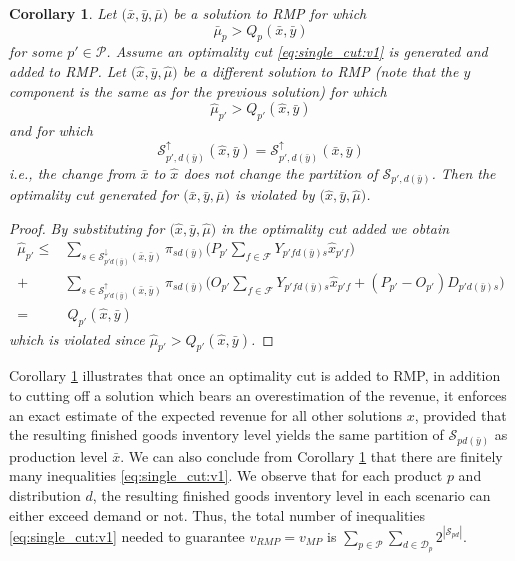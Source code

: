 \documentclass[12pt]{article}
\newtheorem{corollary}[theorem]{Corollary}%
\theoremstyle{thmstylethree}%
\newcommand{\mtc}[1] {\mathcal{#1}}
\begin{document}
\begin{corollary}\label{cor:oc:otherx}
Let $\big(\bar{x},\bar{y},\bar{\mu}\big)$ be a solution to RMP for which 
$$\bar{\mu}_p > Q_{p}(\bar{x},\bar{y})$$
for some $p'\in\mtc{P}$. Assume an optimality cut \eqref{eq:single_cut:v1} is generated and added to RMP.
Let $\big(\hat{x},\bar{y},\hat{\mu}\big)$ be a different solution to RMP (note that the $y$ component is the same as for the previous solution) for which 
$$\hat{\mu}_{p'} > Q_{p'}(\hat{x},\bar{y})$$
and for which 
$$\mathcal{S}^{\uparrow}_{p',d(\bar{y})}(\hat{x},\bar{y}) =\mathcal{S}^{\uparrow}_{p',d(\bar{y})}(\bar{x},\bar{y}) $$
i.e., the change from $\bar{x}$ to $\hat{x}$ does not change the partition of $\mathcal{S}_{p',d(\bar{y})}$.
Then the optimality cut generated for 
$\big(\bar{x},\bar{y},\bar{\mu}\big)$
is violated by $\big(\hat{x},\bar{y},\hat{\mu}\big)$.
\end{corollary}
\begin{proof}
\itshape
  By substituting for $\big(\hat{x},\bar{y},\hat{\mu}\big)$ in the optimality cut added we obtain 
\begin{align*}
\hat{\mu}_{p'} \leq & \sum_{s \in \mathcal{S}^{\downarrow}_{p'd(\bar{y})}(\bar{x},\bar{y})} \pi_{sd(\bar{y})} \bigg(P_{p'} \sum_{f \in \mathcal{F}}Y_{p'fd(\bar{y})s}\hat{x}_{p'f} \bigg) \\ \nonumber 
+~& \sum_{s \in \mathcal{S}^{\uparrow}_{p'd(\bar{y})}(\bar{x},\bar{y})} \pi_{sd(\bar{y})}\bigg(O_{p'}\sum_{f\in\mathcal{F}}Y_{p'fd(\bar{y})s}\hat{x}_{p'f}+(P_{p'}-O_{p'})D_{p'd(\bar{y})s}\bigg)\\
    = &~ Q_{p'}(\hat{x},\bar{y})
\end{align*}
which is violated since $\hat{\mu}_{p'} > Q_{p'}(\hat{x},\bar{y})$. 
\end{proof}
Corollary \ref{cor:oc:otherx} illustrates that once an optimality cut is added to RMP, in addition to cutting off a solution which bears an overestimation of the revenue, it enforces an exact estimate of the expected revenue for all other solutions $x$, provided that the resulting finished goods inventory level yields the same partition of $\mathcal{S}_{pd(\bar{y})}$ as production level $\bar x$. 
We can also conclude from Corollary \ref{cor:oc:otherx} that there are finitely many inequalities \eqref{eq:single_cut:v1}. We observe that for each product $p$ and distribution $d$, the resulting finished goods inventory level in each scenario can either exceed demand or not. Thus, the total number of inequalities \eqref{eq:single_cut:v1} needed to guarantee $v_{RMP} = v_{MP}$ is $\sum_{p\in\mtc{P}}\sum_{d\in\mtc{D}_p}2^{|\mtc{S}_{pd}|}.$
\end{document}
